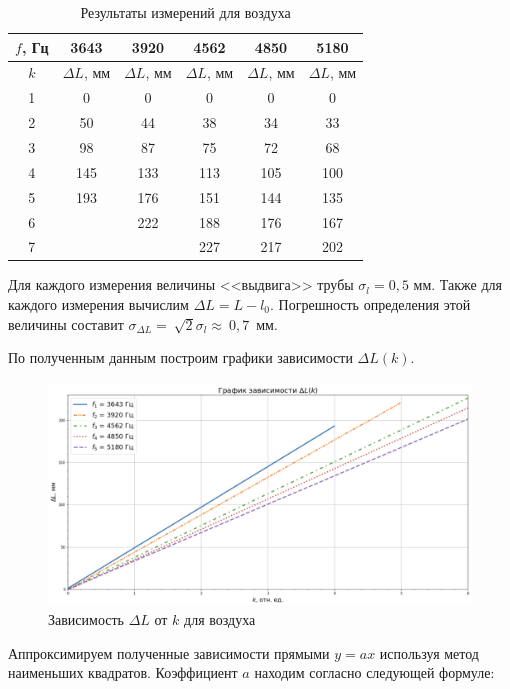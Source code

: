 \documentclass[a4paper,12pt]{article}
\theoremstyle{definition}
\begin{document}
	\begin{table}[H]
		\centering
		\begin{tabular}{|c|c|c|c|c|c|}
			\hline
			$ f $, Гц & 3643  &3920  & 4562& 4850& 5180 \\ \hline
			$ k $ &  $ \Delta L $, мм & $\Delta L $, мм &$\Delta L $, мм & $\Delta L $, мм &  $\Delta L $, мм \\ \hline
			1&0&0&0&0&0\\ \hline
			2&50&44&38&34&33\\\hline
			3&98&87&75&72&68\\\hline
			4&145&133&113&105&100\\\hline
			5&193&176&151&144&135\\\hline
			6&&222&188&176&167\\\hline
			7&&&227&217&202\\\hline
			
		\end{tabular}
		\caption{Результаты измерений для воздуха}
		\label{tab:oxy}
	\end{table}
	
	Для каждого измерения величины <<выдвига>> трубы $ \sigma_l = 0,5 $ мм. Также для каждого измерения вычислим $ \Delta L = L - l_0 $. Погрешность определения этой величины составит $ \sigma_{\Delta L}=~\sqrt{2}\sigma_l \approx~0,7 $~мм.
	
	По полученным данным построим графики зависимости $ \Delta L(k) $.
	
	\begin{figure}[h!]
		\centering
		\includegraphics[scale=0.542]{graph1}
		\caption{Зависимость $ \Delta L $ от $ k $ для воздуха}
		\label{graph1}
	\end{figure}
	
	Аппроксимируем полученные зависимости прямыми $ y=ax $ используя метод наименьших квадратов. Коэффициент $ a $ находим согласно следующей формуле:
	
\end{document}
